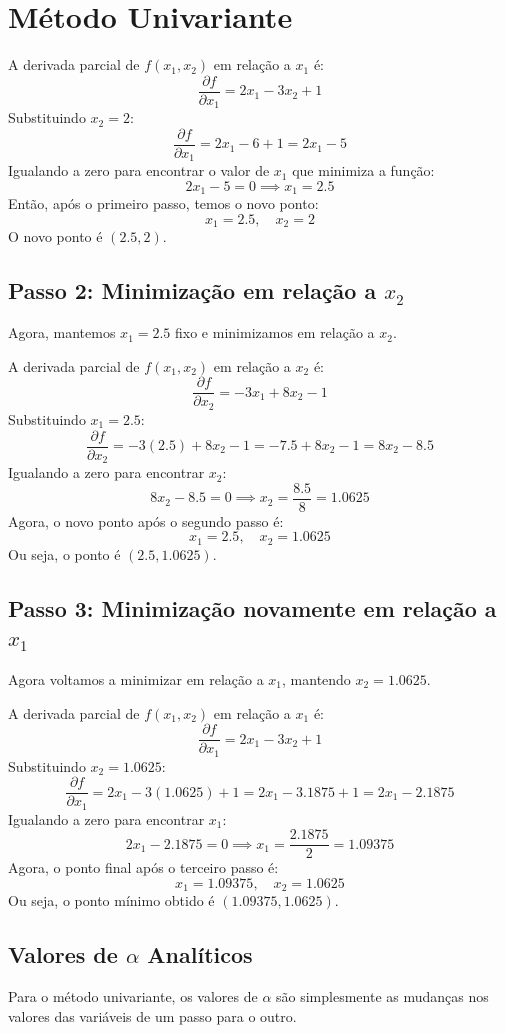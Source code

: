\documentclass[a4paper, 12pt]{article}
\begin{document}
\newpage
\section{Método Univariante}
A derivada parcial de \( f(x_1, x_2) \) em relação a \( x_1 \) é:
\[
\frac{\partial f}{\partial x_1} = 2x_1 - 3x_2 + 1
\]
Substituindo \( x_2 = 2 \):
\[
\frac{\partial f}{\partial x_1} = 2x_1 - 6 + 1 = 2x_1 - 5
\]
Igualando a zero para encontrar o valor de \( x_1 \) que minimiza a função:
\[
2x_1 - 5 = 0 \implies x_1 = 2.5
\]
Então, após o primeiro passo, temos o novo ponto:
\[
x_1 = 2.5, \quad x_2 = 2
\]
O novo ponto é \( (2.5, 2) \).

\subsection{Passo 2: Minimização em relação a \(x_2\)}
Agora, mantemos \( x_1 = 2.5 \) fixo e minimizamos em relação a \( x_2 \).

A derivada parcial de \( f(x_1, x_2) \) em relação a \( x_2 \) é:
\[
\frac{\partial f}{\partial x_2} = -3x_1 + 8x_2 - 1
\]
Substituindo \( x_1 = 2.5 \):
\[
\frac{\partial f}{\partial x_2} = -3(2.5) + 8x_2 - 1 = -7.5 + 8x_2 - 1 = 8x_2 - 8.5
\]
Igualando a zero para encontrar \( x_2 \):
\[
8x_2 - 8.5 = 0 \implies x_2 = \frac{8.5}{8} = 1.0625
\]
Agora, o novo ponto após o segundo passo é:
\[
x_1 = 2.5, \quad x_2 = 1.0625
\]
Ou seja, o ponto é \( (2.5, 1.0625) \).

\subsection{Passo 3: Minimização novamente em relação a \(x_1\)}
Agora voltamos a minimizar em relação a \(x_1\), mantendo \(x_2 = 1.0625\).

A derivada parcial de \( f(x_1, x_2) \) em relação a \( x_1 \) é:
\[
\frac{\partial f}{\partial x_1} = 2x_1 - 3x_2 + 1
\]
Substituindo \( x_2 = 1.0625 \):
\[
\frac{\partial f}{\partial x_1} = 2x_1 - 3(1.0625) + 1 = 2x_1 - 3.1875 + 1 = 2x_1 - 2.1875
\]
Igualando a zero para encontrar \(x_1\):
\[
2x_1 - 2.1875 = 0 \implies x_1 = \frac{2.1875}{2} = 1.09375
\]
Agora, o ponto final após o terceiro passo é:
\[
x_1 = 1.09375, \quad x_2 = 1.0625
\]
Ou seja, o ponto mínimo obtido é \( (1.09375, 1.0625) \).

\subsection{Valores de \( \alpha \) Analíticos}
Para o método univariante, os valores de \( \alpha \) são simplesmente as mudanças nos valores das variáveis de um passo para o outro.
\end{document}
